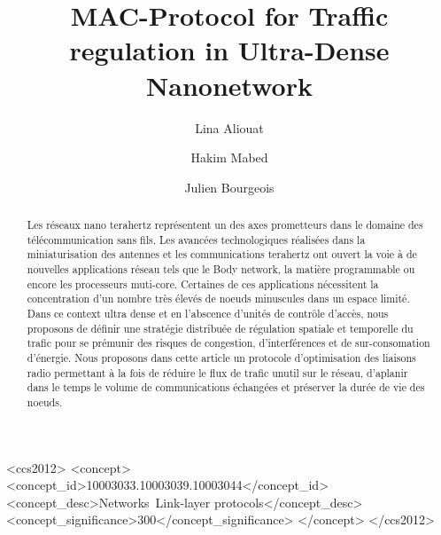 \documentclass[sigconf]{acmart}
\begin{document}
\title{MAC-Protocol for Traffic regulation in Ultra-Dense Nanonetwork}


\author{Lina Aliouat}

\author{Hakim Mabed}

\author{Julien Bourgeois}




\begin{abstract}
Les réseaux nano terahertz représentent un des axes prometteurs dans le domaine des télécommunication sans fils. Les avancées technologiques réalisées dans la miniaturisation des antennes et les communications terahertz ont ouvert la voie à de nouvelles applications réseau tels que le Body network, la matière programmable ou encore les processeurs muti-core. Certaines de ces applications nécessitent la concentration d'un nombre très élevés de noeuds minuscules dans un espace limité. Dans ce context ultra dense et en l'abscence d'unités de contrôle d'accès, nous proposons de définir une stratégie distribuée de régulation spatiale et temporelle du trafic pour se prémunir des risques de congestion, d'interférences et de sur-consomation d'énergie. Nous proposons dans cette article un protocole d'optimisation des liaisons radio permettant à la fois de réduire le flux de trafic unutil sur le réseau, d'aplanir dans le temps le volume de communications échangées et préserver la durée de vie des noeuds.  
\end{abstract}

%
%
\begin{CCSXML}
<ccs2012>
<concept>
<concept_id>10003033.10003039.10003044</concept_id>
<concept_desc>Networks~Link-layer protocols</concept_desc>
<concept_significance>300</concept_significance>
</concept>
</ccs2012>
\end{CCSXML}
\end{document}
